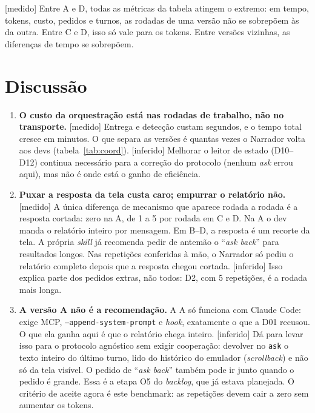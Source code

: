 \documentclass[11pt,a4paper]{article}
\newcommand{\rot}[1]{\textsf{\footnotesize[#1]}}
\begin{document}
\rot{medido} Entre A e D, todas as métricas da tabela atingem o extremo: em tempo, tokens, custo,
pedidos e turnos, as rodadas de uma versão não se sobrepõem às da outra. Entre C e D, isso só vale
para os tokens. Entre versões vizinhas, as diferenças de tempo se sobrepõem.

\section{Discussão}

\begin{enumerate}[leftmargin=*]
\item \textbf{O custo da orquestração está nas rodadas de trabalho, não no transporte.} \rot{medido} Entrega e
  detecção custam segundos, e o tempo total cresce em minutos. O que separa as versões é quantas vezes
  o Narrador volta aos devs (tabela~\ref{tab:coord}). \rot{inferido} Melhorar o leitor de estado (D10--D12)
  continua necessário para a correção do protocolo (nenhum \emph{ask} errou aqui), mas não é onde está o
  ganho de eficiência.

\item \textbf{Puxar a resposta da tela custa caro; empurrar o relatório não.} \rot{medido} A única diferença de
  mecanismo que aparece rodada a rodada é a resposta cortada: zero na A, de 1 a 5 por rodada em C e D.
  Na A o dev manda o relatório inteiro por mensagem. Em B--D, a resposta é um recorte da tela. A própria
  \emph{skill} já recomenda pedir de antemão o ``\emph{ask back}'' para resultados longos. Nas repetições
  conferidas à mão, o Narrador só pediu o relatório completo depois que a resposta chegou cortada.
  \rot{inferido} Isso explica parte dos pedidos extras, não todos: D2, com 5 repetições, é a rodada mais longa.

\item \textbf{A versão A não é a recomendação.} A A só funciona com Claude Code: exige MCP,
  \texttt{--append-system-prompt} e \emph{hook}, exatamente o que a D01 recusou. O que ela ganha
  aqui é que o relatório chega inteiro. \rot{inferido} Dá para levar isso para o protocolo agnóstico
  sem exigir cooperação: devolver no \texttt{ask} o texto inteiro do último turno, lido do histórico
  do emulador (\emph{scrollback}) e não só da tela visível. O pedido de ``\emph{ask back}'' também pode
  ir junto quando o pedido é grande. Essa é a etapa O5 do \emph{backlog}, que já estava planejada. O critério
  de aceite agora é este benchmark: as repetições devem cair a zero sem aumentar os tokens.


\end{enumerate}
\end{document}
